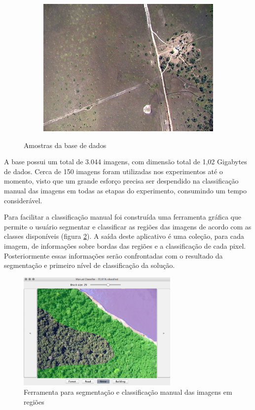 \begin{figure}[h]
\begin{subfigure}[b]{0.3\textwidth}
    \includegraphics[width=\textwidth]{imgs/amostra3}
  \end{subfigure}%
  \caption{Amostras da base de dados}
  \label{fig:amostra}
\end{figure}

A base possui um total de 3.044 imagens, com dimensão total de 1,02 Gigabytes de dados. Cerca de 150 imagens foram utilizadas nos experimentos até o momento, visto que um grande esforço precisa ser despendido na classificação manual das imagens em todas as etapas do experimento, consumindo um tempo considerável.

Para facilitar a classificação manual foi construída uma ferramenta gráfica que permite o usuário segmentar e classificar as regiões das imagens de acordo com as classes disponíveis (figura \ref{fig:visualClassifier}). A saída deste aplicativo é uma coleção, para cada imagem, de informações sobre bordas das regiões e a classificação de cada pixel. Posteriormente essas informações serão confrontadas com o resultado da segmentação e primeiro nível de classificação da solução.

\begin{figure}[h]
  \centering
  \includegraphics[width=0.7\textwidth]{imgs/visualClassifier}
  \caption{Ferramenta para segmentação e classificação manual das imagens em regiões}
  \label{fig:visualClassifier}
\end{figure}

